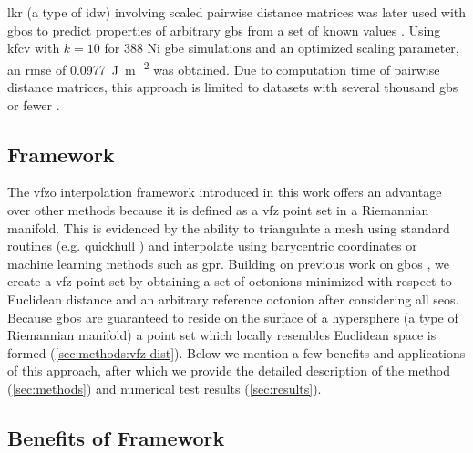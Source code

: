 \documentclass[preprint,12pt]{elsarticle}
\begin{document}
\Gls{lkr} (a type of \gls{idw}) involving scaled pairwise distance matrices was later used with \glspl{gbo} to predict properties of arbitrary \glspl{gb} from a set of known values \cite{chesserLearningGrainBoundary2020}. Using \gls{kfcv} with $k=10$ for \num{388} Ni \gls{gbe} simulations \cite{holmComparingGrainBoundary2010} and an optimized scaling parameter, an \gls{rmse} of \SI{0.0977}{\J\per\square\meter} was obtained. Due to computation time of pairwise distance matrices, this approach is limited to datasets with several thousand \glspl{gb} or fewer \cite{chesserLearningGrainBoundary2020}.

\subsection{ Framework}
The \gls{vfzo} interpolation framework introduced in this work offers an advantage over other methods because it is defined as a \gls{vfz} point set in a Riemannian manifold. This is evidenced by the ability to triangulate a mesh using standard routines (e.g. quickhull \cite{barberQuickhullAlgorithmConvex1996}) and interpolate using barycentric coordinates or machine learning methods such as \gls{gpr}. Building on previous work on \glspl{gbo} \cite{francisGeodesicOctonionMetric2019,chesserLearningGrainBoundary2020}, we create a \gls{vfz} point set by obtaining a set of octonions minimized with respect to Euclidean distance and an arbitrary reference octonion after considering all \glspl{seo}. Because \glspl{gbo} are guaranteed to reside on the surface of a hypersphere \cite{francisGeodesicOctonionMetric2019} (a type of Riemannian manifold) a point set which locally resembles Euclidean space is formed (\cref{sec:methods:vfz-dist}). Below we mention a few benefits and applications of this approach, after which we provide the detailed description of the method (\cref{sec:methods}) and numerical test results (\cref{sec:results}).

\subsection{Benefits of  Framework}
\end{document}
